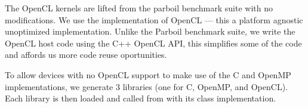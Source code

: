 The OpenCL kernels are lifted from the parboil benchmark suite with no
modifications.  We use the  implementation of OpenCL --- this a
platform agnostic unoptimized implementation.  Unlike the Parboil benchmark
suite, we write the OpenCL host code using the C++ OpenCL API, this simplifies
some of the code and affords us more code reuse oportunities.

To allow devices with no OpenCL support to make use of the C and OpenMP
implementations, we generate 3 libraries (one for C, OpenMP, and OpenCL).  Each
library is then loaded and called from with its class implementation.

